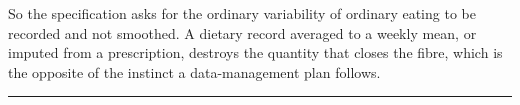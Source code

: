 So the specification asks for the ordinary variability of ordinary eating to be recorded and
not smoothed. A dietary record averaged to a weekly mean, or imputed from a prescription,
destroys the quantity that closes the fibre, which is the opposite of the instinct a
data-management plan follows.

\vspace{0.5em}
\hrule
\vspace{1em}

